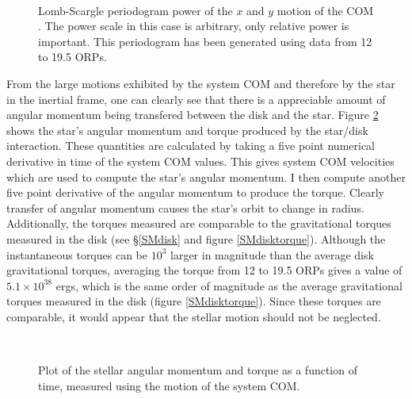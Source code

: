 \begin{figure}[p]
\centering
{}
\\
\caption[COM periodogram for x and y coordinates]{Lomb-Scargle periodogram power of the $x$ and $y$ motion of the COM . The power scale in this case is arbitrary, only relative power is important. This periodogram has been generated using data from 12 to 19.5 ORPs.}
\label{SMxycomperiod}
\end{figure}

From the large motions exhibited by the system COM and therefore by the star in the inertial frame, one can clearly see that there is a appreciable amount of angular momentum being transfered between the disk and the star. Figure \ref{SMcomtorque} shows the star's angular momentum and torque produced by the star/disk interaction. These quantities are calculated by taking a five point numerical derivative in time of the system COM values. This gives system COM velocities which are used to compute the star's angular momentum. I then compute another five point derivative of the angular momentum to produce the torque. Clearly transfer of angular momentum causes the star's orbit to change in radius. Additionally, the torques measured are comparable to the gravitational torques measured in the disk (see \S\ref{SMdisk} and figure \ref{SMdisktorque}). Although the instantaneous torques can be $10^3$ larger in magnitude than the average disk gravitational torques, averaging the torque from 12 to 19.5 ORPs gives a value of $5.1\times10^{38}$ ergs, which is the same order of magnitude as the average gravitational torques measured in the disk (figure \ref{SMdisktorque}). Since these torques are comparable, it would appear that the stellar motion should not be neglected.

\begin{figure}[p]
\centering
{}
\\
\caption[Angular momentum and torque on central star as measured from COM motion]{Plot of the stellar angular momentum and torque as a function of time, measured using the motion of the system COM.}
\label{SMcomtorque}
\end{figure}

